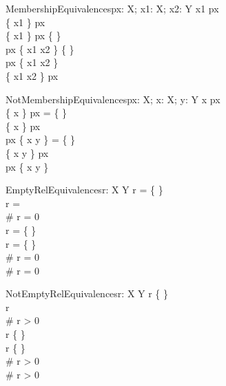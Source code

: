 \begin{rwRule}{MembershipEquivalences}{px: \power X; x1: X; x2: Y}
x1 \in px \\
\{ x1 \} \subseteq px \\
\{ x1 \} \cap px \neq \{ \} \\
px \cap \dom \{ x1 \mapsto x2 \} \neq \{ \} \\
\lnot px \subset \dom \{ x1 \mapsto x2 \} \\
\dom \{ x1 \mapsto x2 \} \subseteq px
\end{rwRule}

\begin{rwRule}{NotMembershipEquivalences}{px: \power X; x: X; y: Y}
x \notin px \\
\{ x \} \cap px = \{ \} \\
\lnot \{ x \} \subseteq px \\
px \cap \dom \{ x \mapsto y \} = \{ \} \\
\lnot \dom \{ x \mapsto y \} \subseteq px \\
px \neq \dom \{ x \mapsto y \}
\end{rwRule}

\begin{rwRule}{EmptyRelEquivalences}{r: X \rel Y}
r = \{ \} \\
r = \langle \rangle \\
\# r = 0 \\
\dom r = \{ \} \\
\ran r = \{ \} \\
\# \dom r = 0 \\
\# \ran r = 0
\end{rwRule}

\begin{rwRule}{NotEmptyRelEquivalences}{r: X \rel Y}
r \neq \{ \} \\
r \neq \langle \rangle \\
\# r > 0 \\
\dom r \neq \{ \} \\
\ran r \neq \{ \} \\
\# \dom r > 0 \\
\# \ran r > 0
\end{rwRule}

